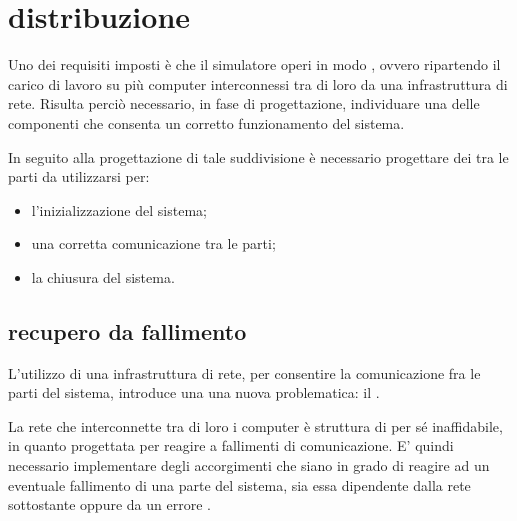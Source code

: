 \section*{distribuzione}
\label{problematiche_distribuzione}
Uno dei requisiti imposti è che il simulatore operi in modo , ovvero ripartendo il carico di lavoro su più computer interconnessi tra di loro da una infrastruttura di rete. Risulta perciò necessario, in fase di progettazione, individuare una  delle componenti che consenta un corretto funzionamento del sistema.

In seguito alla progettazione di tale suddivisione è necessario progettare dei  tra le parti da utilizzarsi per:

\begin{itemize}
\item{l'inizializzazione del sistema;}
\item{una corretta comunicazione tra le parti;}
\item{la chiusura del sistema.}
\end{itemize}

\subsection*{recupero da fallimento}
\label{problematiche_distribuzione_recupero_da_fallimento}
L'utilizzo di una infrastruttura di rete, per consentire la comunicazione fra le parti del sistema, introduce una una nuova problematica: il . 

La rete che interconnette tra di loro i computer è struttura di per sé inaffidabile, in quanto progettata per reagire a fallimenti di comunicazione. E' quindi necessario implementare degli accorgimenti che siano in grado di reagire ad un eventuale fallimento di una parte del sistema, sia essa dipendente dalla rete sottostante oppure da un errore .